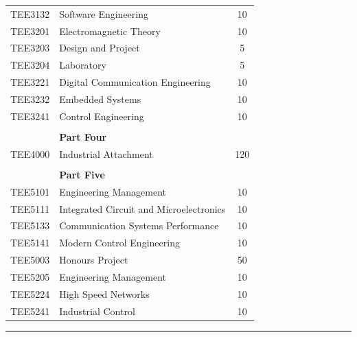 \begin{tcolorbox}[breakable, width=0.5\textwidth, align=left, enhanced, left= -3pt, boxrule=0pt, colback=white, colframe=white, before=\noindent, top=-13pt, bottom=-8pt]
\begin{longtable}{@{}llS[table-format = 4.3]}
                          TEE3132 & Software Engineering & 10 \\
                          TEE3201 & Electromagnetic Theory & 10 \\
                          TEE3203 & Design and Project & 5 \\
                          TEE3204 & Laboratory & 5 \\
                          TEE3221 & Digital Communication Engineering & 10 \\
                          TEE3232 & Embedded Systems & 10 \\
                          TEE3241 & Control Engineering & 10  \\
                          & & \\
                          & \textbf{Part Four} & \\
                          TEE4000 & Industrial Attachment & 120 \\
                          & & \\
                          & \textbf{Part Five} & \\
                          TEE5101 & Engineering Management  & 10 \\
                          TEE5111 & Integrated Circuit and Microelectronics & 10\\
                          TEE5133 & Communication Systems Performance & 10 \\
                          TEE5141 & Modern Control Engineering & 10 \\
                          TEE5003 & Honours Project & 50 \\
                          TEE5205 & Engineering Management  & 10 \\
                          TEE5224 & High Speed Networks & 10\\
                          TEE5241 & Industrial Control & 10
             \end{longtable}%
\end{tcolorbox}
\vspace{2ex}\hrule\vspace{2ex}
